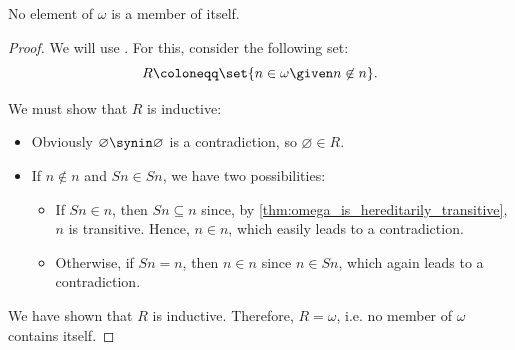 \begin{lemma}\label{thm:members_of_omega_do_not_contain_themselves}
  No element of \( \omega \) is a member of itself.
\end{lemma}
\begin{proof}
  We will use . For this, consider the following set:
  \begin{equation*}
    R \coloneqq \set{ n \in \omega \given n \not\in n }.
  \end{equation*}

  We must show that \( R \) is inductive:
  \begin{itemize}
    \item Obviously \( \varnothing \synin \varnothing \) is a contradiction, so \( \varnothing \in R \).

    \item If \( n \not\in n \) and \( Sn \in Sn \), we have two possibilities:
    \begin{itemize}
      \item If \( Sn \in n \), then \( Sn \subseteq n \) since, by \cref{thm:omega_is_hereditarily_transitive}, \( n \) is transitive. Hence, \( n \in n \), which easily leads to a contradiction.

      \item Otherwise, if \( Sn = n \), then \( n \in n \) since \( n \in Sn \), which again leads to a contradiction.
    \end{itemize}
  \end{itemize}

  We have shown that \( R \) is inductive. Therefore, \( R = \omega \), i.e. no member of \( \omega \) contains itself.
\end{proof}

